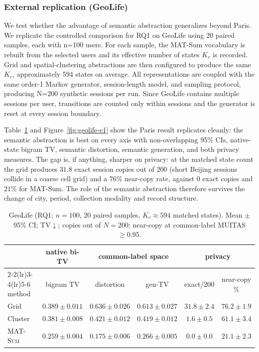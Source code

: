 \documentclass[sigconf,nonacm]{acmart}
\begin{document}
\subsubsection*{External replication (GeoLife)}
\label{sec:geolife-e1}

We test whether the advantage of semantic abstraction generalizes beyond Paris. We replicate the controlled comparison for RQ1 on GeoLife using 20 paired samples, each with n=100 users. For each sample, the MAT-Sum vocabulary is rebuilt from the selected users and its effective number of states $K_r$
 is recorded. Grid and spatial-clustering abstractions are then configured to produce the same $K_r$, approximately 594 states on average. All representations are coupled with the same order-1 Markov generator, session-length model, and sampling protocol, producing N=200 synthetic sessions per run. Since GeoLife contains multiple sessions per user, transitions are counted only within sessions and the generator is reset at every session boundary.

 Table~\ref{tab:geolife-e1} and
Figure~\ref{fig:geolife-e1} show the Paris result replicates cleanly: the semantic abstraction is best on every axis with non-overlapping 95\% CIs, native-state bigram TV, semantic distortion, semantic generation, and both privacy measures. The gap is, if anything, sharper on privacy: at the matched state
count the grid produces $31.8$ exact session copies out of $200$ (short Beijing sessions collide in a coarse cell grid) and a $76\%$ near-copy rate, against $0$ exact copies and $21\%$ for MAT-Sum. The role of the semantic abstraction therefore survives the change of city, period, collection modality
and record structure.

\begin{table}[t]
  \caption{GeoLife (RQ1; $n{=}100$, 20 paired samples, $K_r{\approx}594$ matched states). Mean $\pm$
  95\% CI; TV$\downarrow$; copies out of $N{=}200$; near-copy at common-label MUITAS $\ge0.95$.}
  \label{tab:geolife-e1}
  \small
  \begin{tabular}{@{}lccccc@{}}
    \toprule
    & native bi-TV & \multicolumn{2}{c}{common-label space} & \multicolumn{2}{c}{privacy} \\
    \cmidrule(lr){2-2}\cmidrule(lr){3-4}\cmidrule(lr){5-6}
    method & bigram TV & distortion & gen-TV & exact/200 & near-copy \% \\
    \midrule
    Grid                          & $0.389\pm0.011$ & $0.636\pm0.026$ & $0.613\pm0.027$ & $31.8\pm2.4$ & $76.2\pm1.9$ \\
    Cluster~\cite{kavalionak2026} & $0.381\pm0.008$ & $0.421\pm0.012$ & $0.419\pm0.012$ & $1.6\pm0.5$  & $61.1\pm3.4$ \\
    \textsc{MAT-Sum}              & $\mathbf{0.259\pm0.004}$ & $\mathbf{0.175\pm0.006}$ & $\mathbf{0.266\pm0.005}$ & $\mathbf{0.0\pm0.0}$ & $\mathbf{21.1\pm2.3}$ \\
    \bottomrule
  \end{tabular}
\end{table}
\end{document}
